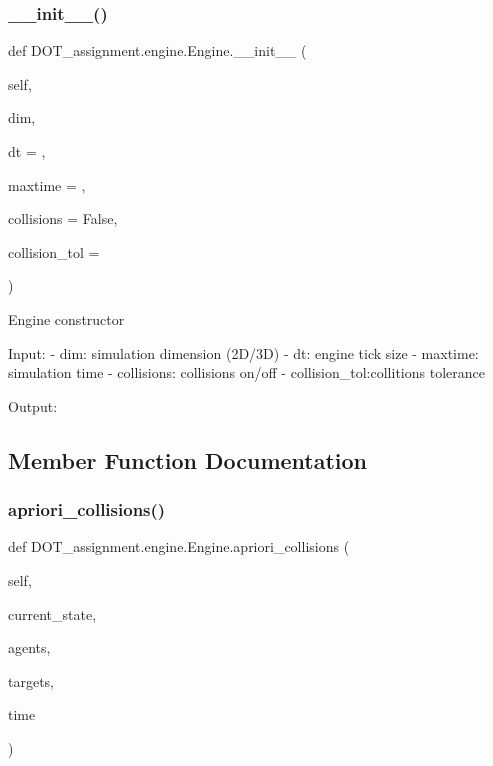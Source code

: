 \subsubsection{\texorpdfstring{\_\_init\_\_()}{\_\_init\_\_()}}
{\footnotesize\ttfamily def D\+O\+T\+\_\+assignment.\+engine.\+Engine.\+\_\+\+\_\+init\+\_\+\+\_\+ (\begin{DoxyParamCaption}\item[{}]{self,  }\item[{}]{dim,  }\item[{}]{dt = {},  }\item[{}]{maxtime = {},  }\item[{}]{collisions = {\ttfamily False},  }\item[{}]{collision\+\_\+tol = {} }\end{DoxyParamCaption})}

\begin{DoxyVerb}Engine constructor

Input:
- dim:          simulation dimension (2D/3D)
- dt:           engine tick size
- maxtime:      simulation time
- collisions:   collisions on/off
- collision_tol:collitions tolerance

Output:\end{DoxyVerb}
 

\subsection{Member Function Documentation}
\mbox{\label{class_d_o_t__assignment_1_1engine_1_1_engine_a965e2f0ced03f6e896b1fbb754c4d5fd}} 
\subsubsection{\texorpdfstring{apriori\_collisions()}{apriori\_collisions()}}
{\footnotesize\ttfamily def D\+O\+T\+\_\+assignment.\+engine.\+Engine.\+apriori\+\_\+collisions (\begin{DoxyParamCaption}\item[{}]{self,  }\item[{}]{current\+\_\+state,  }\item[{}]{agents,  }\item[{}]{targets,  }\item[{}]{time }\end{DoxyParamCaption})}

